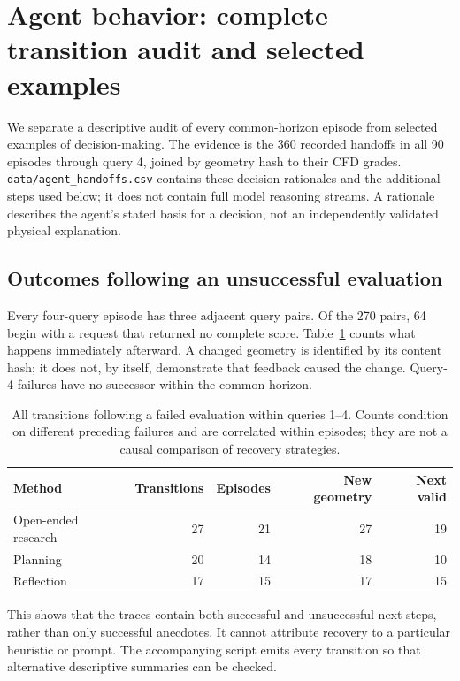 \section{Agent behavior: complete transition audit and selected examples}
\label{app:agent-behavior}

We separate a descriptive audit of every common-horizon episode from selected
examples of decision-making. The evidence is the 360 recorded handoffs in all
90 episodes through query 4, joined by geometry hash to their CFD grades.
\texttt{data/agent\_handoffs.csv} contains these decision rationales and the
additional steps used below; it does not contain full model reasoning streams.
A rationale describes the agent's stated basis for a decision, not an
independently validated physical explanation.

\subsection{Outcomes following an unsuccessful evaluation}

Every four-query episode has three adjacent query pairs. Of the 270 pairs,
64 begin with a request that returned no complete score. Table~\ref{tab:agent-transitions}
counts what happens immediately afterward. A changed geometry is identified
by its content hash; it does not, by itself, demonstrate that feedback caused
the change. Query-4 failures have no successor within the common horizon.

\begin{table}[htbp]
\centering\small
\caption{All transitions following a failed evaluation within queries 1--4.
Counts condition on different preceding failures and are correlated within
episodes; they are not a causal comparison of recovery strategies.}
\label{tab:agent-transitions}
\begin{tabular}{lrrrr}
\toprule
Method & Transitions & Episodes & New geometry & Next valid \\
\midrule
Open-ended research & 27 & 21 & 27 & 19 \\
Planning & 20 & 14 & 18 & 10 \\
Reflection & 17 & 15 & 17 & 15 \\
\bottomrule
\end{tabular}
\end{table}

This shows that the traces contain both successful and unsuccessful next
steps, rather than only successful anecdotes. It cannot attribute recovery
to a particular heuristic or prompt. The accompanying script emits every
transition so that alternative descriptive summaries can be checked.

